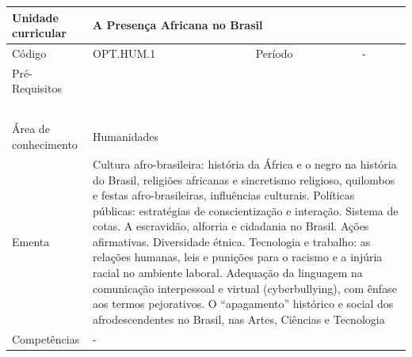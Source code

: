 \begin{quadro}[ht!]
  \centering\scriptsize
\caption{Unidade Curricular A Presença Africana no Brasil}

\begin{tabular}{|p{2.5cm}|p{2.5cm}|p{2.5cm}|p{2.5cm}|p{2.5cm}|}\hline

  Unidade curricular & \multicolumn{4}{p{10cm}|}{ A Presença Africana no Brasil }\\\hline
  Código & OPT.HUM.1 & Período & \multicolumn{2}{p{5cm}|}{ - }\\\hline
  Pré-Requisitos & \multicolumn{4}{p{10cm}|}{  } \\\hline
  \cellcolor{blue1}{ CH PRESENCIAL } &
    \cellcolor{blue1}{CH EAD Síncrona} &
    \cellcolor{blue1}{CH EAD Síncrona Mediada} &
    \cellcolor{blue1}{CH EAD Assíncrona} &
    \cellcolor{blue1}{CH APCC} \\\hline
  \cellcolor{blue1}{ 30 } &
    \cellcolor{blue1}{ 0 } &
    \cellcolor{blue1}{ 0 } &
    \cellcolor{blue1}{ 0 } &
    \cellcolor{blue1}{0} \\\hline
  \cellcolor{blue1}{ CH Teórica } &
    \cellcolor{blue1}{CH Prática} &
    \cellcolor{blue1}{CH Humanidades} &
    \cellcolor{blue1}{CH Extensão} &
    \cellcolor{blue1}{CH EAD TOTAL} \\\hline
  \cellcolor{blue1}{ 30 } &
    \cellcolor{blue1}{ 0 } &
    \cellcolor{blue1}{ 30 } &
    \cellcolor{blue1}{ 0 } &
    \cellcolor{blue1}{ 0 } \\\hline
  \cellcolor{blue1}{CARGA-HORÁRIA TOTAL} & \multicolumn{4}{p{10cm}|}{ \cellcolor{blue1}{ 30 } } \\\hline
  Área de conhecimento & \multicolumn{4}{p{10cm}|}{ Humanidades } \\\hline
  Ementa & \multicolumn{4}{p{10cm}|}{ Cultura afro-brasileira: história da África e o negro na história do Brasil, religiões africanas e sincretismo religioso, quilombos e festas afro-brasileiras, influências culturais. Políticas públicas: estratégias de conscientização e interação. Sistema de cotas. A escravidão, alforria e cidadania no Brasil. Ações afirmativas. Diversidade étnica. Tecnologia e trabalho:  as relações humanas, leis e punições para o racismo e a injúria racial no ambiente laboral. Adequação da linguagem na comunicação interpessoal e virtual (cyberbullying), com ênfase   aos termos pejorativos. O ``apagamento'' histórico e social dos afrodescendentes no Brasil, nas Artes, Ciências e Tecnologia } \\\hline
  Competências & \multicolumn{4}{p{10cm}|}{ - } \\\hline


  
	\end{tabular}

\end{quadro}


\clearpage
\newpage

